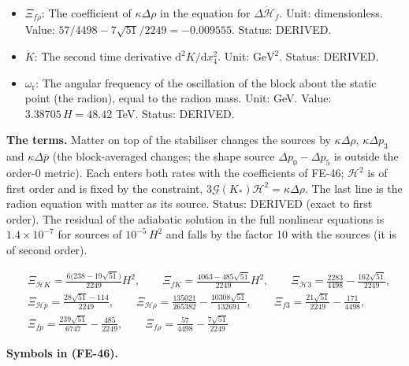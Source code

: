 \documentclass[
  10pt,
]{article}
\begin{document}
\begin{itemize}
  \(\Xi_{fp}\): The coefficient of \(\kappa\Delta\bar p\) in the
  equation for \(\Delta\dot{\mathcal{H}}_f\). Unit: dimensionless.
  Value: \(239\sqrt{51}/6747 - 485/2249 = 0.037320\). Status: DERIVED.
\item
  \(\Xi_{f\rho}\): The coefficient of \(\kappa\Delta\rho\) in the
  equation for \(\Delta\dot{\mathcal{H}}_f\). Unit: dimensionless.
  Value: \(57/4498 - 7\sqrt{51}/2249 = -0.009555\). Status: DERIVED.
\item
  \(\ddot K\): The second time derivative
  \(\mathrm{d}^2K/\mathrm{d}x_4^2\). Unit: \(\mathrm{GeV}^{2}\). Status:
  DERIVED.
\item
  \(\omega_{\mathrm{r}}\): The angular frequency of the oscillation of
  the block about the static point (the radion), equal to the radion
  mass. Unit: GeV. Value: \(3.38705\,H = 48.42\) TeV. Status: DERIVED.
\end{itemize}

\textbf{The terms.} Matter on top of the stabiliser changes the sources
by \(\kappa\Delta\rho\), \(\kappa\Delta p_3\) and \(\kappa\Delta\bar p\)
(the block-averaged changes; the shape source
\(\Delta p_0 - \Delta p_5\) is outside the order-0 metric). Each enters
both rates with the coefficients of FE-46; \(\mathcal{H}^2\) is of first
order and is fixed by the constraint,
\(3\mathcal{G}(K_*)\mathcal{H}^2 = \kappa\Delta\rho\). The last line is
the radion equation with matter as its source. Status: DERIVED (exact to
first order). The residual of the adiabatic solution in the full
nonlinear equations is \(1.4\times10^{-7}\) for sources of
\(10^{-5}\,H^2\) and falls by the factor 10 with the sources (it is of
second order).

\[
\begin{aligned}
&\Xi_{\mathcal{H}K} = \frac{6\big(238 - 19\sqrt{51}\big)}{2249}H^2,\qquad \Xi_{fK} = \frac{4063 -
 485\sqrt{51}}{2249}H^2,\qquad
 \Xi_{\mathcal{H}3} = \frac{2283}{4498} - \frac{162\sqrt{51}}{2249},\\
&\Xi_{\mathcal{H}p} = \frac{28\sqrt{51} - 114}{2249},\qquad
 \Xi_{\mathcal{H}\rho} = \frac{135021}{265382} - \frac{10308\sqrt{51}}{132691},\qquad
 \Xi_{f3} = \frac{21\sqrt{51}}{2249} - \frac{171}{4498},\\
&\Xi_{fp} = \frac{239\sqrt{51}}{6747} - \frac{485}{2249},\qquad \Xi_{f\rho} = \frac{57}{4498} -
 \frac{7\sqrt{51}}{2249}
\end{aligned} \tag{FE-46}
\]

\textbf{Symbols in (FE-46).}
\end{document}
